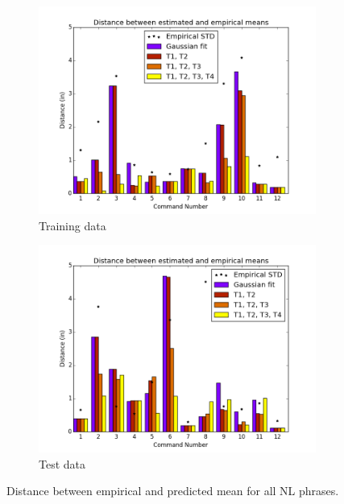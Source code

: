\documentclass[12pt,letterpaper]{article}
\begin{document}
\begin{figure}[H]
\centering
\begin{subfigure}{.5\textwidth}
  \centering
  \includegraphics[width=1.1\textwidth]{images/mean_dist_training.png}
  \caption{Training data}
  \label{fig:sub1}
\end{subfigure}%
\begin{subfigure}{.5\textwidth}
  \centering
  \includegraphics[width=1.1\textwidth]{images/mean_dist_test.png}
  \caption{Test data}
  \label{fig:sub2}
\end{subfigure}
\caption{Distance between empirical and predicted mean for all NL phrases. }
\label{fig:means}
\end{figure}
\end{document}
